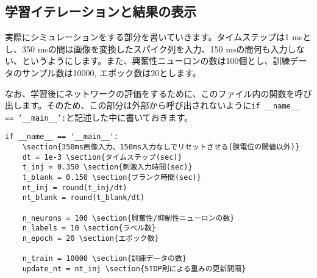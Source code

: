 \subsection{学習イテレーションと結果の表示}
実際にシミュレーションをする部分を書いていきます。タイムステップは1 msとし、350 msの間は画像を変換したスパイク列を入力、150 msの間何も入力しない、というようにします。また、興奮性ニューロンの数は100個とし、訓練データのサンプル数は10000, エポック数は20とします。\par
なお、学習後にネットワークの評価をするために、このファイル内の関数を呼び出します。そのため、この部分は外部から呼び出されないように\texttt{if \_\_name\_\_ == '\_\_main\_\_':}と記述した中に書いておきます。
\begin{verbatim}
if __name__ == '__main__':
    \section{350ms画像入力、150ms入力なしでリセットさせる(膜電位の閾値以外)}
    dt = 1e-3 \section{タイムステップ(sec)}
    t_inj = 0.350 \section{刺激入力時間(sec)}
    t_blank = 0.150 \section{ブランク時間(sec)}
    nt_inj = round(t_inj/dt)
    nt_blank = round(t_blank/dt)
    
    n_neurons = 100 \section{興奮性/抑制性ニューロンの数}
    n_labels = 10 \section{ラベル数}
    n_epoch = 20 \section{エポック数}
    
    n_train = 10000 \section{訓練データの数}
    update_nt = nt_inj \section{STDP則による重みの更新間隔}
    

\end{verbatim}
